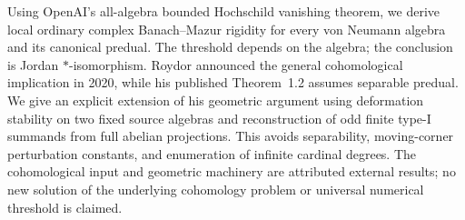 
Using OpenAI's all-algebra bounded Hochschild vanishing theorem, we derive
local ordinary complex Banach--Mazur rigidity for every von Neumann
algebra and its canonical predual. The threshold depends on the algebra;
the conclusion is Jordan $*$-isomorphism. Roydor announced the general
cohomological implication in 2020, while his published Theorem~1.2 assumes
separable predual. We give an explicit extension of his geometric argument
using deformation stability on two fixed source algebras and reconstruction
of odd finite type-I summands from full abelian projections. This avoids
separability, moving-corner perturbation constants, and enumeration of
infinite cardinal degrees. The cohomological input and geometric machinery
are attributed external results; no new solution of the underlying
cohomology problem or universal numerical threshold is claimed.
